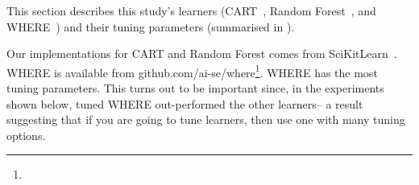 This section describes this study's learners (CART~\cite{brieman00}, Random Forest~\cite{breiman84}, 
and WHERE~\cite{menzies2013local}) and their
tuning parameters (summarised in ).

Our implementations
for CART and Random Forest comes from 
SciKitLearn~\cite{scikit-learn}.
WHERE is available from
github.com/ai-se/where\footnote{}.
WHERE has the most tuning parameters. This turns out
to be important since, in the experiments shown below, tuned WHERE 
out-performed the other learners-- a result suggesting that
if you are going to tune learners, then use one with many tuning options.

\renewcommand\arraystretch{1.2}
